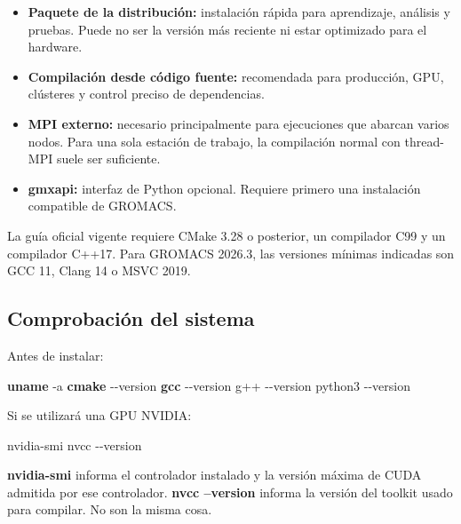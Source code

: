 \documentclass[
  spanish,
  11pt,
  a4paper]{article}
\newenvironment{Shaded}{\begin{snugshade}}{\end{snugshade}}
\newcommand{\AttributeTok}[1]{\textcolor[rgb]{0.13,0.29,0.53}{#1}}
\newcommand{\ExtensionTok}[1]{#1}
\newcommand{\FunctionTok}[1]{\textcolor[rgb]{0.13,0.29,0.53}{\textbf{#1}}}
\providecommand{\tightlist}{%
  \setlength{\itemsep}{0pt}\setlength{\parskip}{0pt}}
\begin{document}
\begin{itemize}
\tightlist
\item
  \textbf{Paquete de la distribución:} instalación rápida para
  aprendizaje, análisis y pruebas. Puede no ser la versión más reciente
  ni estar optimizado para el hardware.
\item
  \textbf{Compilación desde código fuente:} recomendada para producción,
  GPU, clústeres y control preciso de dependencias.
\item
  \textbf{MPI externo:} necesario principalmente para ejecuciones que
  abarcan varios nodos. Para una sola estación de trabajo, la
  compilación normal con thread-MPI suele ser suficiente.
\item
  \textbf{gmxapi:} interfaz de Python opcional. Requiere primero una
  instalación compatible de GROMACS.
\end{itemize}

La guía oficial vigente requiere CMake 3.28 o posterior, un compilador
C99 y un compilador C++17. Para GROMACS 2026.3, las versiones mínimas
indicadas son GCC 11, Clang 14 o MSVC 2019.

\subsection{Comprobación del sistema}\label{comprobaciuxf3n-del-sistema}

Antes de instalar:

\begin{Shaded}
\begin{Highlighting}[]
\FunctionTok{uname} \AttributeTok{{-}a}
\FunctionTok{cmake} \AttributeTok{{-}{-}version}
\FunctionTok{gcc} \AttributeTok{{-}{-}version}
\ExtensionTok{g++} \AttributeTok{{-}{-}version}
\ExtensionTok{python3} \AttributeTok{{-}{-}version}
\end{Highlighting}
\end{Shaded}

Si se utilizará una GPU NVIDIA:

\begin{Shaded}
\begin{Highlighting}[]
\ExtensionTok{nvidia{-}smi}
\ExtensionTok{nvcc} \AttributeTok{{-}{-}version}
\end{Highlighting}
\end{Shaded}

\textbf{nvidia-smi} informa el controlador instalado y la versión máxima
de CUDA admitida por ese controlador. \textbf{nvcc --version} informa la
versión del toolkit usado para compilar. No son la misma cosa.
\end{document}
